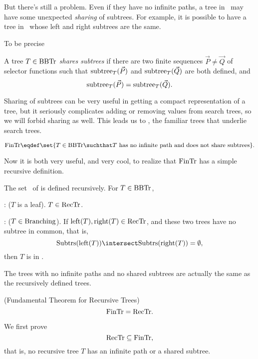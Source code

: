 But there's still a problem.  Even if they
have no infinite paths, a tree in \brnch\ may have some unexpected
\emph{sharing} of subtrees.  For example, it is possible to have a
tree in \brnch\ whose left and right subtrees are the same.


To be precise
\begin{definition}
A tree $T \in \text{BBTr}$ \emph{shares subtrees} if there are two finite
sequences $\vec{P} \neq \vec{Q}$ of selector functions such that
$\text{subtree}_{T}(\vec{P})$ and $\text{subtree}_{T}(\vec{Q})$ are both defined, and
\[
\text{subtree}_{T}(\vec{P})=\text{subtree}_{T}(\vec{Q}).
\]
\end{definition}
Sharing of subtrees can be very useful in getting a compact
representation of a tree, but it seriously complicates adding or
removing values from search trees, so we will forbid sharing as well.
This leads us to \fintr, the familiar trees that underlie search
trees.
\begin{definition}
\[
\fintr \eqdef \set{T \in \brnch \suchthat T\ \text{has no infinite path and
  does not share subtrees}}.
\]
\end{definition}

Now it is both very useful, and very cool, to realize that $\text{FinTr}$
has a simple recursive definition.

\begin{definition}
The set \rectr\ of  is defined recursively.  For
$T \in \text{BBTr}$,

: ($T$ is a leaf).  $T \in \text{RecTr}$.

: ($T \in \text{Branching}$).
If $\text{left}(T), \text{right}(T) \in \text{RecTr}$, and these two trees
have no subtree in common, that is,
\[
\subbrn{\leftsub{(T)}} \intersect \subbrn{\rightsub{(T)}} = \emptyset,
\]
then $T$ is in \rectr.
\end{definition}

The trees with no infinite paths and no shared subtrees are actually
the same as the recursively defined trees.

\begin{theorem}\label{fundthmrec}(Fundamental Theorem for Recursive Trees)
\[
\text{FinTr} = \text{RecTr}.
\]
\end{theorem}

We first prove
\begin{equation}\label{rectrsubfintr}
\text{RecTr} \subseteq \text{FinTr},
\end{equation}
that is, no recursive tree $T$ has an infinite path or a shared subtree.

